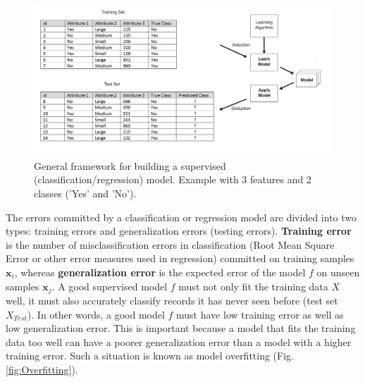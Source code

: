 
\begin{figure}[h!]
	\centering
	\includegraphics[width=0.9\linewidth]{images/LearningFramework}
	\caption{General framework for building a supervised (classification/regression) model. Example with 3 features and 2 classes ('Yes' and 'No').}
	\label{fig:LearningFramework}
\end{figure}


The errors committed by a classification or regression model are divided into two types: training errors and generalization errors (testing errors). \textbf{Training error} is the number of misclassification errors in classification (Root Mean Square Error or other error measures used in regression) committed on training samples $\textbf{x}_i$, whereas \textbf{generalization error} is the expected error of the model $f$ on unseen samples $\textbf{x}_j$. A good supervised model $f$ must not only fit the training data $X$ well, it must also accurately classify records it has never seen before (test set $X_{Test}$). In other words, a good model $f$ must have low training error as well as low generalization error. This is important because a model that fits the training data too well can have a poorer generalization error than a model with a higher training error. Such a situation is known as model overfitting (Fig. \ref{fig:Overfitting}).

